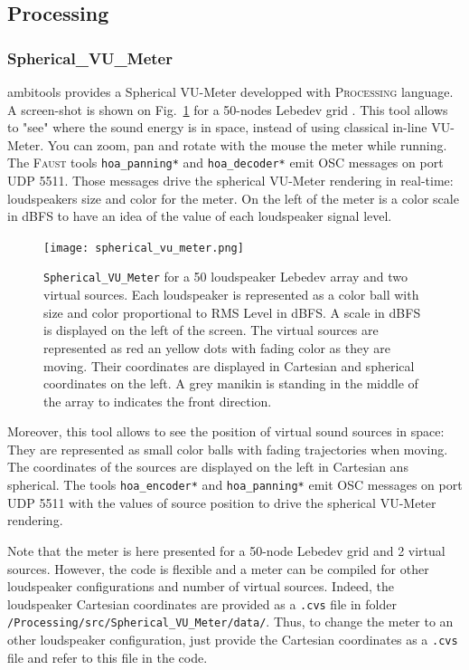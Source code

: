 \documentclass[10pt,a4paper]{article}
\begin{document}
\subsection{Processing}
\subsubsection{Spherical\_VU\_Meter}
\label{sec:processing}
ambitools provides a Spherical VU-Meter developped with \textsc{Processing} language. A screen-shot is shown on Fig.~\ref{fig:spherical_vu_meter} for a 50-nodes Lebedev grid \cite{lecomte2015on}. This tool allows to "see" where the sound energy is in space, instead of using classical in-line VU-Meter. You can zoom, pan and rotate with the mouse the meter while running. The \textsc{Faust} tools \lstinline'hoa_panning*' and \lstinline'hoa_decoder*' emit \textsc{OSC} messages on port UDP 5511. Those messages drive the spherical VU-Meter rendering in real-time: loudspeakers size and color for the meter. On the left of the meter is a color scale in dBFS to have an idea of the value of each loudspeaker signal level.
\begin{figure}[!ht]
\centering
\texttt{[image: spherical\_vu\_meter.png]}
\caption{\lstinline'Spherical_VU_Meter' for a 50 loudspeaker Lebedev array and two virtual sources. Each loudspeaker is represented as a color ball with size and color proportional to RMS Level in dBFS. A scale in dBFS is displayed on the left of the screen. The virtual sources are represented as red an yellow dots with fading color as they are moving. Their coordinates are displayed in Cartesian and spherical coordinates on the left. A grey manikin is standing in the middle of the array to indicates the front direction.}
\label{fig:spherical_vu_meter}
\end{figure}
Moreover, this tool allows to see the position of virtual sound sources in space: They are represented as small color balls with fading trajectories when moving. The coordinates of the sources are displayed on the left in Cartesian ans spherical. The tools \lstinline'hoa_encoder*' and \lstinline'hoa_panning*' emit \textsc{OSC} messages on port UDP 5511 with the values of source position to drive the spherical VU-Meter rendering.

Note that the meter is here presented for a 50-node Lebedev grid and 2 virtual sources. However, the code is flexible and a meter can be compiled for other loudspeaker configurations and number of virtual sources. Indeed, the loudspeaker Cartesian coordinates are provided as a \lstinline'.cvs' file in folder \lstinline'/Processing/src/Spherical_VU_Meter/data/'. Thus, to change the meter to an other loudspeaker configuration, just provide the Cartesian coordinates as a \lstinline'.cvs' file and refer to this file in the code.
\end{document}
